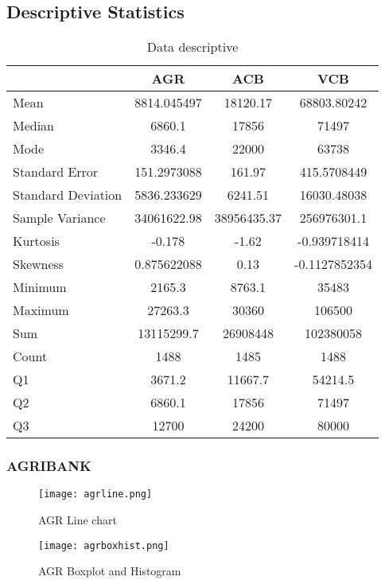 \documentclass{ieeeojies}
\begin{document}
\subsection{Descriptive Statistics}
\begin{table}[H]
\begin{tabular}{lccc}
\hline
                   & AGR         & ACB         & VCB           \\ \hline
Mean               & 8814.045497 & 18120.17    & 68803.80242   \\
Median             & 6860.1      & 17856       & 71497         \\
Mode               & 3346.4      & 22000       & 63738         \\
Standard Error     & 151.2973088 & 161.97      & 415.5708449   \\
Standard Deviation & 5836.233629 & 6241.51     & 16030.48038   \\
Sample Variance    & 34061622.98 & 38956435.37 & 256976301.1   \\
Kurtosis           & -0.178      & -1.62       & -0.939718414  \\
Skewness           & 0.875622088 & 0.13        & -0.1127852354 \\
Minimum            & 2165.3      & 8763.1      & 35483         \\
Maximum            & 27263.3     & 30360       & 106500        \\
Sum                & 13115299.7  & 26908448    & 102380058     \\
Count              & 1488        & 1485        & 1488          \\
Q1                 & 3671.2      & 11667.7     & 54214.5       \\
Q2                 & 6860.1      & 17856       & 71497         \\
Q3                 & 12700       & 24200       & 80000         \\ \hline
\end{tabular}
\caption{\centering Data descriptive}
\end{table}
\subsubsection{AGRIBANK}

\begin{figure}[H]
    \centering
    \texttt{[image: agrline.png]}
    \caption{\centering AGR Line chart}
    \label{fig:enter-label}
\end{figure}
\vspace{-2\baselineskip}
\begin{figure}[H]
    \centering
    \texttt{[image: agrboxhist.png]}
    \caption{\centering AGR Boxplot and Histogram}
    \label{fig:enter-label}
\end{figure}
 \vspace{-2\baselineskip}
\end{document}
